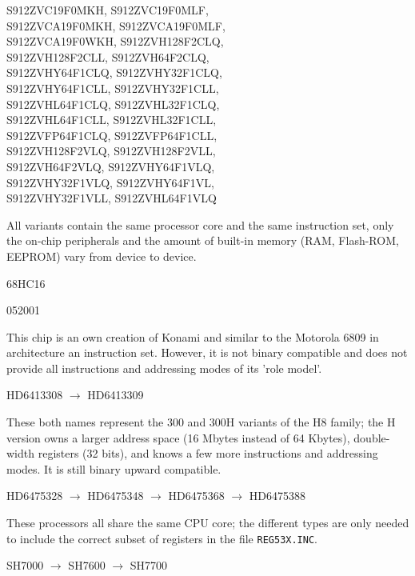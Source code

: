 \documentclass[12pt,twoside]{report}
\newcommand{\tty}[1]{{\tt #1}}
\begin{document}
\begin{cpulist}
   S912ZVC19F0MKH, S912ZVC19F0MLF,\\
\> S912ZVCA19F0MKH, S912ZVCA19F0MLF,\\
\> S912ZVCA19F0WKH, S912ZVH128F2CLQ,\\
\> S912ZVH128F2CLL, S912ZVH64F2CLQ,\\
\> S912ZVHY64F1CLQ, S912ZVHY32F1CLQ,\\
\> S912ZVHY64F1CLL, S912ZVHY32F1CLL,\\
\> S912ZVHL64F1CLQ, S912ZVHL32F1CLQ,\\
\> S912ZVHL64F1CLL, S912ZVHL32F1CLL,\\
\> S912ZVFP64F1CLQ, S912ZVFP64F1CLL,\\
\> S912ZVH128F2VLQ, S912ZVH128F2VLL,\\
\> S912ZVH64F2VLQ, S912ZVHY64F1VLQ,\\
\> S912ZVHY32F1VLQ, S912ZVHY64F1VL,\\
\> S912ZVHY32F1VLL, S912ZVHL64F1VLQ
\end{cpulist}
All variants contain the same processor core and the same
instruction set, only the on-chip peripherals and the
amount of built-in memory (RAM, Flash-ROM, EEPROM)
vary from device to device.
\begin{cpulist}
   68HC16
\end{cpulist}
\begin{cpulist}
   052001
\end{cpulist}
This chip is an own creation of Konami and similar to the
Motorola 6809 in architecture an instruction set.  However,
it is not binary compatible and does not provide all instructions
and addressing modes of its 'role model'.
\begin{cpulist}
   HD6413308 $\rightarrow$ HD6413309
\end{cpulist}
These both names represent the 300 and 300H variants of the H8
family; the H version owns a larger address space (16 Mbytes instead
of 64 Kbytes), double-width registers (32 bits), and knows a few more
instructions and addressing modes.  It is still binary upward
compatible.
\begin{cpulist}
   HD6475328 $\rightarrow$ HD6475348 $\rightarrow$ HD6475368 $\rightarrow$ HD6475388
\end{cpulist}
These processors all share the same CPU core; the different types are
only needed to include the correct subset of registers in the file
\tty{REG53X.INC}.
\begin{cpulist}
   SH7000 $\rightarrow$ SH7600 $\longrightarrow$ SH7700
\end{cpulist}
\end{document}
